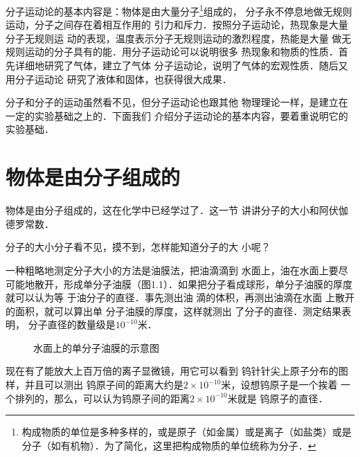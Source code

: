 分子运动论的基本内容是：物体是由大量分子\footnote{构成物质的单位是多种多样的，或是原子（如金属）或是离子（如盐类）或是分子（如有机物）．为了简化，这里把构成物质的单位统称为分子．}组成的，
分子永不停息地做无规则运动，分子之间存在着相互作用的
引力和斥力．按照分子运动论，热现象是大量分子无规则运
动的表现，温度表示分子无规则运动的激烈程度，热能是大量
做无规则运动的分子具有的能．用分子运动论可以说明很多
热现象和物质的性质．首先详细地研究了气体，建立了气体
分子运动论，说明了气体的宏观性质．随后又用分子运动论
研究了液体和固体，也获得很大成果．

    分子和分子的运动虽然看不见，但分子运动论也跟其他
物理理论一样，是建立在一定的实验基础之上的．下面我们
介绍分子运动论的基本内容，要着重说明它的实验基础．

\section{物体是由分子组成的}
    物体是由分子组成的，这在化学中已经学过了．这一节
讲讲分子的大小和阿伏伽德罗常数．

    分子的大小分子看不见，摸不到，怎样能知道分子的大
小呢？

    一种粗略地测定分子大小的方法是油膜法，把油滴滴到
水面上，油在水面上要尽可能地散开，形成单分子油膜（图1.1）．如果把分子看成球形，单分子油膜的厚度就可以认为等
于油分子的直径．事先测出油
滴的体积，再测出油滴在水面
上散开的面积，就可以算出单
分子油膜的厚度，这样就测出
了分子的直径．测定结果表明，
分子直径的数量级是$10^{-10}$米．

\begin{figure}[htp]
\centering
{}

\caption{水面上的单分子油膜的示意图}
\end{figure}

    现在有了能放大上百万倍的离子显微镜，用它可以看到
钨针针尖上原子分布的图样，并且可以测出
钨原子间的距离大约是$2\times 10^{-10}$米，设想钨原子是一个挨着
一个排列的，那么，可以认为钨原子间的距离$2\times 10^{-10}$米就是
钨原子的直径．

